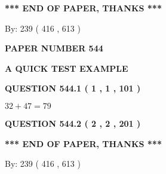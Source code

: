 \documentclass[12pt]{article}
\begin{document}
   
 \vspace{0.2in}
 
   
   
   
   
\vspace{1.0in} 
{\textbf{\large{ *** END OF PAPER, THANKS *** }}} 
   
   
\hspace{1.0in} By: 
 239 ( 416 ,  613 )
   
   
   
   
\newpage 
\setcounter{page}{ 
   544001 } 
   
   
   
   
 {\textbf{ \Large{ PAPER NUMBER  544  }}}
   
   
\vspace{0.2in}
   
   
   
   
   
   
 \vspace{0.2in}
{\LARGE {\textbf{ A QUICK TEST EXAMPLE}}}
   
   
  
\vspace{0.2in}
  
{\textbf{\Large{QUESTION
544.1 
 ( 1 , 1 , 101 )
}}}
  
  
 
 

$ %
32 +  %
47=   %
79$
 
 
  
\vspace{0.2in}
  
{\textbf{\Large{QUESTION
544.2 
 ( 2 , 2 , 201 )
}}}
  
  
   
   
 \vspace{0.2in}
 
   
   
   
   
\vspace{1.0in} 
{\textbf{\large{ *** END OF PAPER, THANKS *** }}} 
   
   
\hspace{1.0in} By: 
 239 ( 416 ,  613 )
   
   
   
   
\newpage 
\setcounter{page}{ 
   545001 } 
   
   
   
\end{document}
